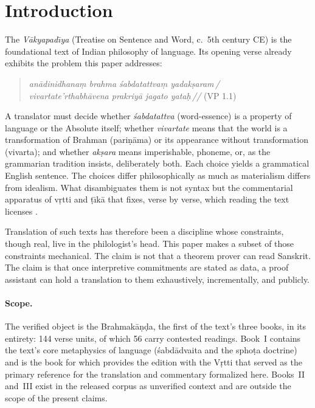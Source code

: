 \documentclass[11pt]{article}
\begin{document}
\section{Introduction}
\label{sec:intro}

The \emph{V\={a}kyapad\={\i}ya} (Treatise on Sentence and Word, c.~5th
century CE) is the foundational text of Indian philosophy of language. Its
opening verse already exhibits the problem this paper addresses:

\begin{quote}
\emph{an\={a}dinidhana\d{m} brahma \'sabdatattva\d{m} yadak\d{s}aram\,/\\
vivartate'rthabh\={a}vena prakriy\={a} jagato yata\d{h}\,//} (VP 1.1)
\end{quote}

A translator must decide whether \emph{\'sabdatattva} (word-essence) is a
property of language or the Absolute itself; whether \emph{vivartate} means
that the world is a transformation of Brahman (pari\d{n}\={a}ma) or its
appearance without transformation (vivarta); and whether \emph{ak\d{s}ara}
means imperishable, phoneme, or, as the grammarian tradition insists,
deliberately both. Each choice yields a grammatical English sentence. The
choices differ philosophically as much as materialism differs from idealism.
What disambiguates them is not syntax but the commentarial apparatus of
v\d{r}tti and \d{t}\={\i}k\={a} that fixes, verse by verse, which reading the
text licenses \citep{iyer1965vakyapadiya, houben2016vakyapadiya}.

Translation of such texts has therefore been a discipline whose constraints,
though real, live in the philologist's head. This paper makes a subset of
those constraints mechanical. The claim is not that a theorem prover can read
Sanskrit. The claim is that once interpretive commitments are stated as data,
a proof assistant can hold a translation to them exhaustively, incrementally,
and publicly.

\paragraph{Scope.} The verified object is the Brahmak\={a}\d{n}\d{d}a, the
first of the text's three books, in its entirety: 144 verse units, of which
56 carry contested readings. Book~I contains the text's core metaphysics of
language (\'sabd\={a}dvaita and the spho\d{t}a doctrine) and is the book for
which \citet{iyer1965vakyapadiya} provides the edition with the V\d{r}tti
that served as the primary reference for the translation and commentary
formalized here. Books~II and~III exist in the released corpus as unverified
context and are outside the scope of the present claims.
\end{document}
